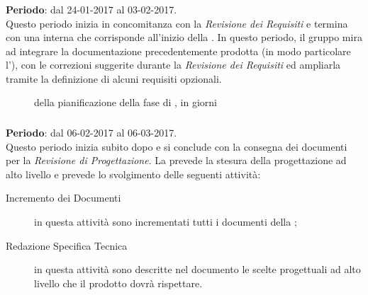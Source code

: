 	\subsubsection{\ARI} \label{sec:ARI}
	\textbf{Periodo}: dal 24-01-2017 al 03-02-2017.
	\\ Questo periodo inizia in concomitanza con la \emph{Revisione dei Requisiti} e termina con una  interna che corrisponde all'inizio della \PA. In questo periodo, il gruppo mira ad integrare la documentazione precedentemente prodotta (in modo particolare l'\AR), con le correzioni suggerite durante la \emph{Revisione dei Requisiti} ed ampliarla tramite la definizione di alcuni requisiti opzionali.



\begin{figure}[H]
\label{tab:genweeks}
\caption{ della pianificazione della fase di \ARI, in giorni}
\end{figure}

	
	\subsubsection{\PA} \label{sec:PA}
	\textbf{Periodo}: dal 06-02-2017 al 06-03-2017.	
	\\ Questo periodo inizia subito dopo \ARI{} e si conclude con la consegna dei documenti per la \emph{Revisione di Progettazione}. La \PA{} prevede la stesura della progettazione ad alto livello e prevede lo svolgimento delle seguenti attività:
	\begin{description}
		\item[Incremento dei Documenti] in questa attività sono incrementati tutti i documenti della \PA{};
		\item[Redazione Specifica Tecnica] in questa attività sono descritte nel documento le scelte progettuali ad alto livello che il prodotto dovrà rispettare.
	\end{description}
	

